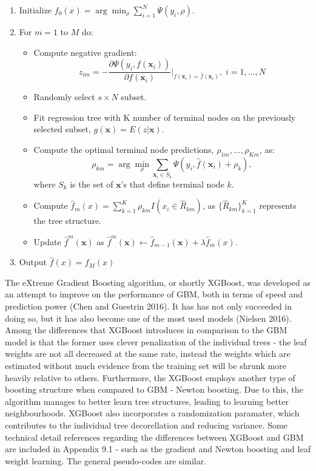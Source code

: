 \documentclass[12pt,]{article}
\providecommand{\tightlist}{%
  \setlength{\itemsep}{0pt}\setlength{\parskip}{0pt}}
\begin{document}
\begin{enumerate}
\def\labelenumi{\arabic{enumi}.}
\item
  Initialize \(f_{0}(x) = \arg\min_{\rho}\sum_{i=1}^{N}\Psi(y_i,\rho)\).
\item
  For \(m=1\) to \(M\) do:

  \begin{itemize}
  \tightlist
  \item
    Compute negative gradient:
    \[z_{im}=-\frac{\partial{\Psi(y_{i},f(\mathbf{x}_i))}}{\partial{f(\mathbf{x}_i)}}\rvert_{f(\mathbf{x}_i)=\widehat{f}(\mathbf{x}_i)},\; i=1,...,N\]
  \item
    Randomly select \(s \times N\) subset.
  \item
    Fit regression tree with K number of terminal nodes on the
    previously selected subset, \(g(\mathbf{x})=E(z|\mathbf{x})\).
  \item
    Compute the optimal terminal node predictions,
    \(\rho_{1m},...,\rho_{Km}\), as:
    \[\rho_{km}=\arg\min_{\rho}\sum_{\mathbf{x}_i \in S_k} \Psi(y_i,\widehat{f}(\mathbf{x}_{i})+\rho_k),\]
    where \(S_k\) is the set of \(\mathbf{x}\)'s that define terminal
    node \(k\).
  \item
    Compute
    \(\widehat{f}_{m}(x)=\sum_{k=1}^{K}\rho_{km}I(x_i\in\widehat{R}_{km})\),
    as \(\{\widehat{R}_{km}\}_{k=1}^{K}\) represents the tree structure.
  \item
    Update \(\widehat{f}^{m}(\mathbf{x})\) as
    \(\widehat{f}^{m}(\mathbf{x}) \leftarrow \widehat{f}_{m-1}(\mathbf{x}) + \lambda\widehat{f}_{m}(x)\).
  \end{itemize}
\item
  Output \(\widehat{f}(x) = f_{M}(x)\)
\end{enumerate}

The eXtreme Gradient Boosting algorithm, or shortly XGBoost, was
developed as an attempt to improve on the performance of GBM, both in
terms of speed and prediction power (Chen and Guestrin 2016). It has has
not only succeeded in doing so, but it has also become one of the most
used models (Nielsen 2016). Among the differences that XGBoost
introduces in comparison to the GBM model is that the former uses clever
penalization of the individual trees - the leaf weights are not all
decreased at the same rate, instead the weights which are estimated
without much evidence from the training set will be shrunk more heavily
relative to others. Furthermore, the XGBoost employs another type of
boosting structure when compared to GBM - Newton boosting. Due to this,
the algorithm manages to better learn tree structures, leading to
learning better neighbourhoods. XGBoost also incorporates a
randomization paramater, which contributes to the individual tree
decorellation and reducing variance. Some technical detail references
regarding the differences between XGBoost and GBM are included in
Appendix 9.1 - such as the gradient and Newton boosting and leaf weight
learning. The general pseudo-codes are similar.
\end{document}

